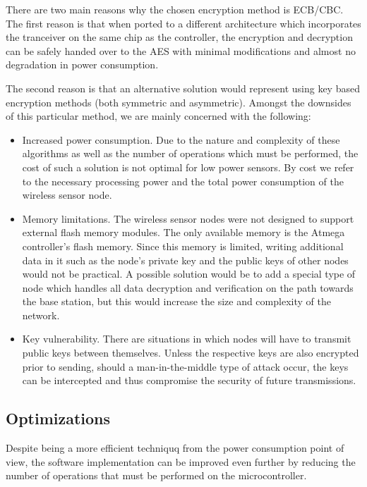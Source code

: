 There are two main reasons why the chosen encryption method is ECB/CBC. The first 
reason is that when ported to a different architecture which incorporates the 
tranceiver on the same chip as the controller, the encryption and decryption can be safely 
handed over to the AES with minimal modifications and almost no degradation in 
power consumption.

The second reason is that an alternative solution would represent using key based 
encryption methods (both symmetric and asymmetric). Amongst the downsides of this 
particular method, we are mainly concerned with the following:

\begin{itemize}

\item Increased power consumption. Due to the nature and complexity of these algorithms 
as well as the number of operations which must be performed, the cost of such a 
solution is not optimal for low power sensors. By cost we refer to the necessary 
processing power and the total power consumption of the wireless sensor node.
\item Memory limitations. The wireless sensor nodes were not designed to support 
external flash memory modules. The only available memory is the Atmega controller's 
flash memory. Since this memory is limited, writing additional data in it such as 
the node's private key and the public keys of other nodes would not be practical.
A possible solution would be to add a special type of node which handles all data 
decryption and verification on the path towards the base station, but this would 
increase the size and complexity of the network.
\item Key vulnerability. There are situations in which nodes will have to transmit 
public keys between themselves. Unless the respective keys are also encrypted prior 
to sending, should a man-in-the-middle type of attack occur, the keys can be intercepted 
and thus compromise the security of future transmissions.

\end{itemize}

\subsection{Optimizations}

Despite being a more efficient techniquq from the power consumption point of view, the 
software implementation can be improved even further by reducing the number of operations 
that must be performed on the microcontroller.

